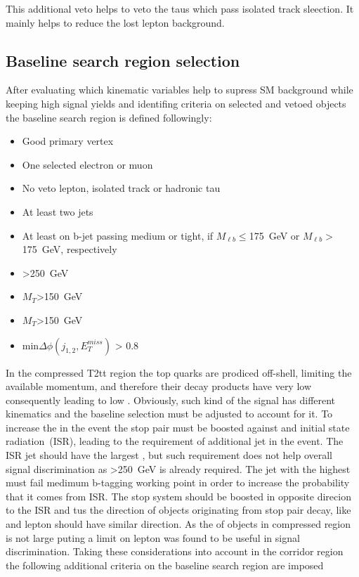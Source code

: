 This additional veto helps to veto the taus which pass isolated track sleection. It mainly helps to reduce the lost lepton background.

\subsection{Baseline search region selection~\label{sec:baseline}}

After evaluating which kinematic variables help to supress SM background while keeping high signal yields and identifing criteria on selected and vetoed objects the baseline search region is defined followingly:

\begin{itemize}

\item Good primary vertex
\item One selected electron or muon
\item No veto lepton, isolated track or hadronic tau
\item At least two jets
\item At least on b-jet passing medium or tight, if $M_{\ell b} \leq$175~GeV or $M_{\ell b}>$175~GeV, respectively
\item \MET>250~GeV
\item $M_{T}$>150~GeV
\item $M_{T}$>150~GeV
\item min$\Delta \phi (j_{1,2}, E_{T}^{miss})$ > 0.8

\end{itemize}

In the compressed T2tt region the top quarks are prodiced off-shell, limiting the available momentum,  and therefore their decay products have very low \pt consequently leading to low \MET. Obviously, such kind of the signal has different kinematics and the baseline selection must be adjusted to account for it. To increase the \MET in the event the stop pair must be boosted against and initial state radiation~(ISR), leading to the requirement of additional jet in the event. The ISR jet should have the largest \pt, but such requirement does not help overall signal discrimination as \MET>250~GeV is already required. The jet with the highest \pt must fail medimum b-tagging working point in order to increase the probability that it comes from ISR. The stop system should be boosted in opposite direcion to the ISR and tus the direction of objects originating from stop pair decay, like \MET and lepton should have similar direction. As the \pt of objects in compressed region is not large puting a limit on lepton \pt was found to be useful in signal discrimination. Taking these considerations into account in the corridor region the following additional criteria on the baseline search region  are imposed

